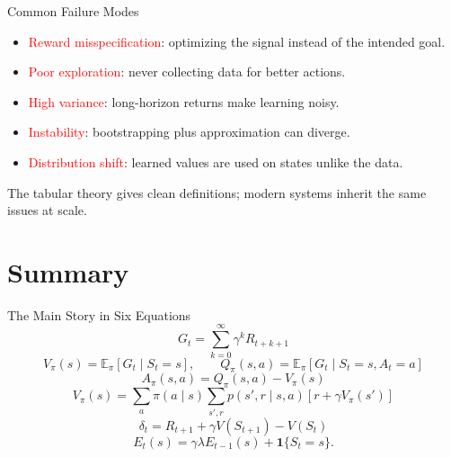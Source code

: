 \documentclass[aspectratio=169]{beamer}
\newcommand{\EE}{\mathbb{E}}
\newcommand{\one}{\mathbf{1}}
\newcommand{\red}[1]{\textcolor{red}{#1}}
\begin{document}
\begin{frame}{Common Failure Modes}
\small
\begin{itemize}
    \item \red{Reward misspecification}: optimizing the signal instead of the intended goal.
    \item \red{Poor exploration}: never collecting data for better actions.
    \item \red{High variance}: long-horizon returns make learning noisy.
    \item \red{Instability}: bootstrapping plus approximation can diverge.
    \item \red{Distribution shift}: learned values are used on states unlike the data.
\end{itemize}

\vspace{0.7em}
The tabular theory gives clean definitions; modern systems inherit the same issues at scale.
\end{frame}

\section{Summary}

\begin{frame}{The Main Story in Six Equations}
\small
\[
G_t=\sum_{k=0}^{\infty}\gamma^k R_{t+k+1}
\]
\[
V_\pi(s)=\EE_\pi[G_t\mid S_t=s],
\qquad
Q_\pi(s,a)=\EE_\pi[G_t\mid S_t=s,A_t=a]
\]
\[
A_\pi(s,a)=Q_\pi(s,a)-V_\pi(s)
\]
\[
V_\pi(s)=\sum_a\pi(a\mid s)\sum_{s',r}p(s',r\mid s,a)[r+\gamma V_\pi(s')]
\]
\[
\delta_t=R_{t+1}+\gamma V(S_{t+1})-V(S_t)
\]
\[
E_t(s)=\gamma\lambda E_{t-1}(s)+\one\{S_t=s\}.
\]
\end{frame}
\end{document}
